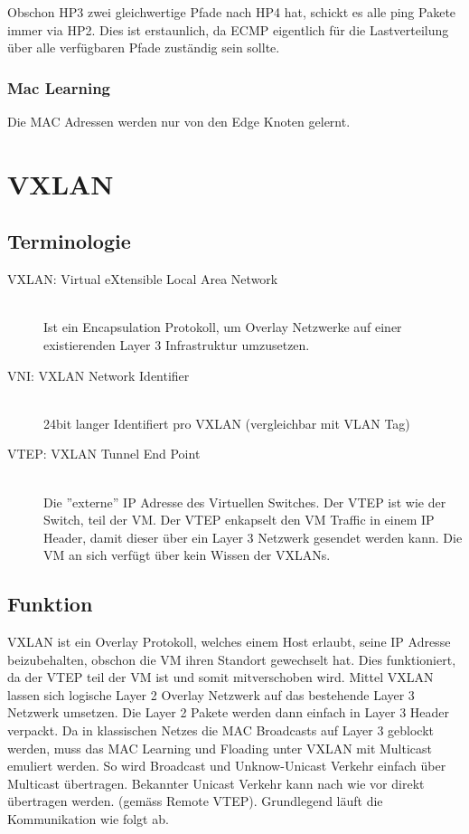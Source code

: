 Obschon HP3 zwei gleichwertige Pfade nach HP4 hat, schickt es alle ping Pakete immer via HP2. Dies ist erstaunlich, da ECMP eigentlich für die Lastverteilung über alle verfügbaren Pfade zuständig sein sollte.

\subsubsection{Mac Learning}
Die MAC Adressen werden nur von den Edge Knoten gelernt. 


\section{VXLAN}
\subsection{Terminologie}
\begin{description}
	\item[VXLAN: Virtual eXtensible Local Area Network] \hfill \\
	Ist ein Encapsulation Protokoll, um Overlay Netzwerke auf einer existierenden Layer 3 Infrastruktur umzusetzen.
	\item[VNI: VXLAN Network Identifier] \hfill \\
	24bit langer Identifiert pro VXLAN (vergleichbar mit VLAN Tag)
	\item[VTEP: VXLAN Tunnel End Point] \hfill \\
	Die ''externe'' IP Adresse des Virtuellen Switches. Der VTEP ist wie der Switch, teil der VM. Der VTEP enkapselt den VM Traffic in einem IP Header, damit dieser über ein Layer 3 Netzwerk gesendet werden kann. Die VM an sich verfügt über kein Wissen der VXLANs.
\end{description}

\subsection{Funktion}
VXLAN ist ein Overlay Protokoll, welches einem Host erlaubt, seine IP Adresse beizubehalten, obschon die VM ihren Standort gewechselt hat. Dies funktioniert, da der VTEP teil der VM ist und somit mitverschoben wird. Mittel VXLAN lassen sich logische Layer 2 Overlay Netzwerk auf das bestehende Layer 3 Netzwerk umsetzen. Die Layer 2 Pakete werden dann einfach in Layer 3 Header verpackt. Da in klassischen Netzes die MAC Broadcasts auf Layer 3 geblockt werden, muss das MAC Learning und Floading unter VXLAN mit Multicast emuliert werden. So wird Broadcast und Unknow-Unicast Verkehr einfach über Multicast übertragen. Bekannter Unicast Verkehr kann nach wie vor direkt übertragen werden. (gemäss Remote VTEP). Grundlegend läuft die Kommunikation wie folgt ab.

